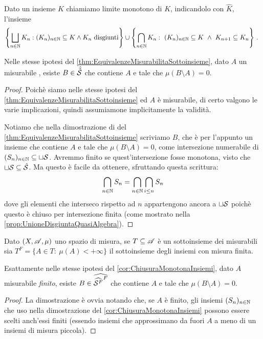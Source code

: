 \begin{corollary}\label{cor:ChiusuraMonotonaInsiemi}
	Dato un insieme $K$ chiamiamo limite monotono di $K$, indicandolo con $\hat K$, l'insieme
	\begin{equation*}
		\left\{\bigsqcup_{n\in\N}K_n:(K_n)_{n\in\N}\subseteq K\wedge K_n \text{ disgiunti}\right\}\cup
		\left\{\bigcap_{n\in\N}K_n:\ (K_n)_{n\in\N}\subseteq K\ \wedge\ K_{n+1}\subseteq K_n\right\} \punto
	\end{equation*}
	
	Nelle stesse ipotesi del \cref{thm:EquivalenzeMisurabilitaSottoinsieme}, dato $A$ un misurabile \sigfin[o], esiste $B\in\hat{\hat\S}$ che contiene $A$ e tale che $\mu(B\setminus A)=0$.
\end{corollary}
\begin{proof}
	Poichè siamo nelle stesse ipotesi del \cref{thm:EquivalenzeMisurabilitaSottoinsieme} ed $A$ è misurabile, di certo valgono le varie implicazioni, quindi assumiamone implicitamente la validità.
	
	Notiamo che nella dimostrazione di  del \cref{thm:EquivalenzeMisurabilitaSottoinsieme} scriviamo $B$, che è per l'appunto un insieme che contiene $A$ e tale che $\mu(B\setminus A)=0$, come intersezione numerabile di $(S_n)_{n\in\N}\subseteq \sqcup \S$.
	Avremmo finito se quest'intersezione fosse monotona, visto che $\sqcup \S\subseteq \hat \S$.
	Ma questo è facile da ottenere, sfruttando questa scrittura:
	\begin{equation*}
		\bigcap_{n\in\N} S_n = \bigcap_{n\in\N} \bigcap_{i\le n} S_n
	\end{equation*}
	dove gli elementi che interseco rispetto ad $n$ appartengono ancora a $\sqcup \S$ poichè questo è chiuso per intersezione finita (come mostrato nella \cref{prop:UnioneDisgiuntaQuasiAlgebra}).
\end{proof}

\begin{corollary}\label{cor:ChiusuraMonotonaInsiemiFiniti}
	Dato $(X,\A,\mu)$ uno spazio di misura, se $T\subseteq\A$ è un sottoinsieme dei misurabili sia $T^F=\{A\in T:\ \mu(A)<+\infty\}$ il sottoinsieme degli insiemi con misura finita.
	
	Esattamente nelle stesse ipotesi del \cref{cor:ChiusuraMonotonaInsiemi}, dato $A$ misurabile \emph{finito}, esiste $B\in\widehat{{\widehat{\S^F}}^F}$ che contiene $A$ e tale che $\mu(B\setminus A)=0$.
\end{corollary}
\begin{proof}
	La dimostrazione è ovvia notando che, se $A$ è finito, gli insiemi $(S_n)_{n\in\N}$ che uso nella dimostrazione del \cref{cor:ChiusuraMonotonaInsiemi} possono essere scelti anch'essi finiti (essendo insiemi che approssimano da fuori $A$ a meno di un insiemi di misura piccola).
\end{proof}



